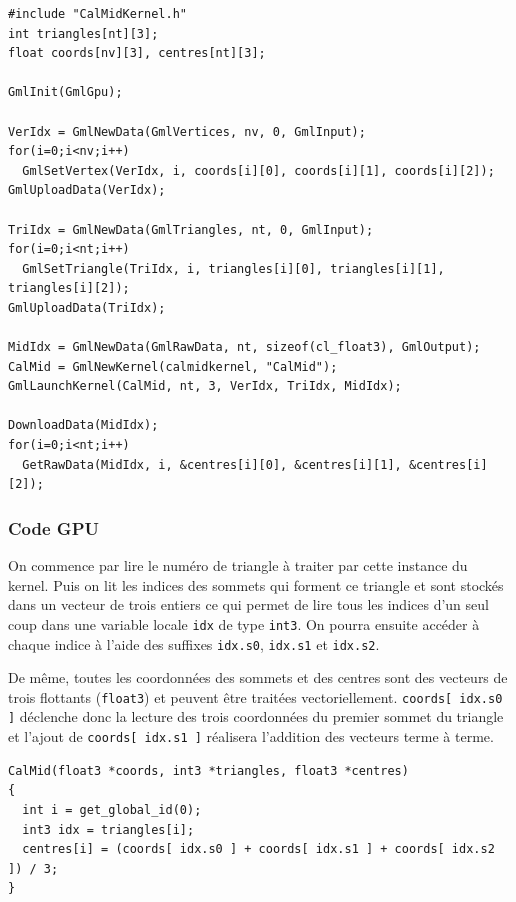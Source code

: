 \documentclass[a4paper,12pt]{article}
\begin{document}
\begin{tt}
\begin{verbatim}
#include "CalMidKernel.h"
int triangles[nt][3];
float coords[nv][3], centres[nt][3];

GmlInit(GmlGpu);

VerIdx = GmlNewData(GmlVertices, nv, 0, GmlInput);
for(i=0;i<nv;i++)
  GmlSetVertex(VerIdx, i, coords[i][0], coords[i][1], coords[i][2]);
GmlUploadData(VerIdx);

TriIdx = GmlNewData(GmlTriangles, nt, 0, GmlInput);
for(i=0;i<nt;i++)
  GmlSetTriangle(TriIdx, i, triangles[i][0], triangles[i][1], triangles[i][2]);
GmlUploadData(TriIdx);

MidIdx = GmlNewData(GmlRawData, nt, sizeof(cl_float3), GmlOutput);
CalMid = GmlNewKernel(calmidkernel, "CalMid");
GmlLaunchKernel(CalMid, nt, 3, VerIdx, TriIdx, MidIdx);

DownloadData(MidIdx);
for(i=0;i<nt;i++)
  GetRawData(MidIdx, i, &centres[i][0], &centres[i][1], &centres[i][2]);
\end{verbatim}
\end{tt}
\normalfont


\subsubsection{Code GPU}
On commence par lire le numéro de triangle à traiter par cette instance du kernel.
Puis on lit les indices des sommets qui forment ce triangle et sont stockés dans un vecteur de trois entiers ce qui permet de lire tous les indices d'un seul coup dans une variable locale {\tt idx} de type {\tt int3}. On pourra ensuite accéder à chaque indice à l'aide des suffixes {\tt idx.s0}, {\tt idx.s1} et {\tt idx.s2}.

De même, toutes les coordonnées des sommets et des centres sont des vecteurs de trois flottants ({\tt float3}) et peuvent être traitées vectoriellement. {\tt coords[ idx.s0 ]} déclenche donc la lecture des trois coordonnées du premier sommet du triangle et l'ajout de {\tt coords[ idx.s1 ]} réalisera l'addition des vecteurs terme à terme.

\begin{tt}
\begin{verbatim}
CalMid(float3 *coords, int3 *triangles, float3 *centres)
{
  int i = get_global_id(0);
  int3 idx = triangles[i];
  centres[i] = (coords[ idx.s0 ] + coords[ idx.s1 ] + coords[ idx.s2 ]) / 3;
}
\end{verbatim}
\end{tt}
\normalfont
\end{document}
